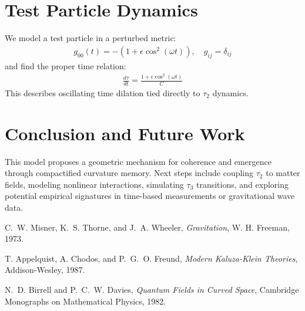 \documentclass[12pt]{article}
\begin{document}
\section{Test Particle Dynamics}

We model a test particle in a perturbed metric:
\begin{align}
  g_{00}(t) = -\left(1 + \epsilon \cos^2(\omega t) \right), \quad g_{ij} = \delta_{ij}
\end{align}
and find the proper time relation:
\begin{align}
  \frac{d\tau}{dt} = \frac{1 + \epsilon \cos^2(\omega t)}{C}
\end{align}
This describes oscillating time dilation tied directly to $\tau_2$ dynamics.

\section{Conclusion and Future Work}

This model proposes a geometric mechanism for coherence and emergence through compactified curvature memory. Next steps include coupling $\tau_2$ to matter fields, modeling nonlinear interactions, simulating $\tau_3$ transitions, and exploring potential empirical signatures in time-based measurements or gravitational wave data.

\begin{thebibliography}{9}

C.~W. Misner, K.~S. Thorne, and J.~A. Wheeler, \emph{Gravitation}, W. H. Freeman, 1973.

T. Appelquist, A. Chodos, and P.~G.~O. Freund, \emph{Modern Kaluza-Klein Theories}, Addison-Wesley, 1987.

N.~D. Birrell and P.~C.~W. Davies, \emph{Quantum Fields in Curved Space}, Cambridge Monographs on Mathematical Physics, 1982.

\end{thebibliography}
\end{document}
